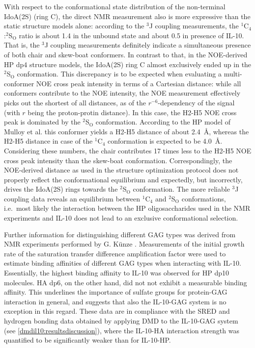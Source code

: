 With respect to the conformational state distribution of the non-terminal
IdoA(2S) (ring C), the direct NMR measurement also is more expressive than the
static structure models alone: according to the ${}^{3}$J coupling measurements,
the ${}^1$C${}_4$:${}^2$S${}_\mathrm{O}$ ratio is about 1.4 in the unbound state
and about 0.5 in presence of IL-10. That is, the ${}^{3}$J coupling measurements
definitely indicate a simultaneous presence of both chair and skew-boat
conformers. In contrast to that, in the NOE-derived HP dp4 structure models, the
IdoA(2S) ring C almost exclusively ended up in the  ${}^2$S${}_\mathrm{O}$
conformation. This discrepancy is to be expected when evaluating a
multi-conformer NOE cross peak intensity in terms of a Cartesian distance: while
all conformers contribute to the NOE intensity, the NOE measurement effectively
picks out the shortest of all distances, as of the $r^{-6}$-dependency of the
signal (with $r$ being the proton-protin distance). In this case, the H2-H5 NOE
cross peak is dominated by the ${}^2$S${}_\mathrm{O}$ conformation. According to
the HP model of Mulloy et al. \cite{foster_mulloy_1993} this conformer yields a
H2-H5 distance of about \SI{2.4}{\angstrom}, whereas the H2-H5 distance in case
of the ${}^1$C${}_4$ conformation is expected to be \SI{4.0}{\angstrom}.
Considering these numbers, the chair contributes 17 times less to the H2-H5 NOE
cross peak intensity than the skew-boat conformation. Correspondingly, the
NOE-derived distance as used in the structure optimization protocol does not
properly reflect the conformational equilibrium and expectedly, but incorrectly,
drives the IdoA(2S) rings towards the ${}^2$S${}_\mathrm{O}$ conformation. The
more reliable ${}^{3}$J coupling data reveals an equilibrium between
${}^1$C${}_4$ and ${}^2$S${}_\mathrm{O}$ conformations, i.e.\ most likely the
interaction between the HP oligosaccharides used in the NMR experiments and
IL-10 does not lead to an exclusive conformational selection.

Further information for distinguishing different GAG types was derived from NMR
experiments performed by G. Künze \cite{kuenze_gehrcke_2014}. Measurements of
the initial growth rate of the saturation transfer difference amplification
factor were used to estimate binding affinities of different GAG types when
interacting with IL-10. Essentially, the highest binding affinity to IL-10 was
observed for HP dp10 molecules. HA dp6, on the other hand, did not not exhibit a
measurable binding affinity. This underlines the importance of sulfate groups
for protein-GAG interaction in general, and suggests that also the IL-10-GAG
system is no exception in this regard. These data are in compliance with the
SRED and hydrogen bonding data obtained by applying DMD to the IL-10-GAG system
(see \cref{dmdil10:resultsdiscussion}), where the IL-10-HA interaction strength
was quantified to be significantly weaker than for IL-10-HP.

